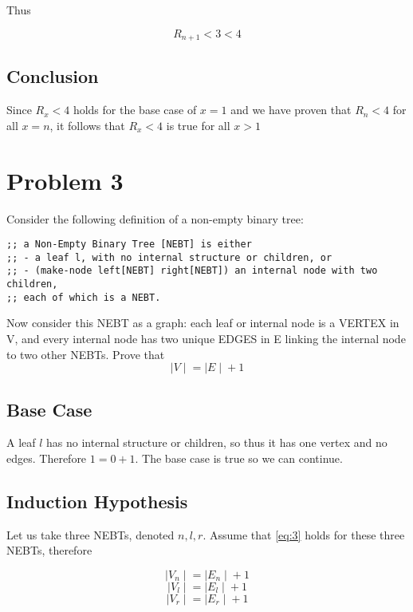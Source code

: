 \documentclass[paper=a4, fontsize=11pt]{scrartcl} %
\numberwithin{equation}{section} %
\numberwithin{figure}{section} %
\numberwithin{table}{section} %
\begin{document}
Thus

\begin{equation}
R_{n+1} < 3 < 4
\end{equation}

\subsection{Conclusion}

Since $R_x < 4$ holds for the base case of $x = 1$ and we have proven that $R_n < 4$ for all $x=n$, it follows that $R_x < 4$ is true for all $x>1$

\section{Problem 3}
Consider the following definition of a non-empty binary tree:

\begin{verbatim}
;; a Non-Empty Binary Tree [NEBT] is either
;; - a leaf l, with no internal structure or children, or
;; - (make-node left[NEBT] right[NEBT]) an internal node with two children, 
;; each of which is a NEBT.
\end{verbatim}
Now consider this NEBT as a graph: each leaf or internal node is a VERTEX in V, and every
internal node has two unique EDGES in E linking the internal node to two other NEBTs. Prove that 
\begin{equation}\label{eq:3}
\mid{V}\mid{} = \mid{E}\mid{} + 1
\end{equation}
\subsection{Base Case}
A leaf $l$ has no internal structure or children, so thus it has one vertex and no edges. Therefore $1=0+1$. The base case is true so we can continue.
\subsection{Induction Hypothesis}
Let us take three NEBTs, denoted $n,l,r$. Assume that \ref{eq:3} holds for these three NEBTs, therefore

\begin{equation}
\mid{V_n}\mid{} = \mid{E_n}\mid{} + 1
\end{equation}
\begin{equation}
\mid{V_l}\mid{} = \mid{E_l}\mid{} + 1
\end{equation}
\begin{equation}
\mid{V_r}\mid{} = \mid{E_r}\mid{} + 1
\end{equation}
\end{document}
